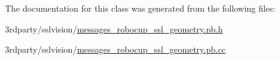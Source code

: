 The documentation for this class was generated from the following files\-:\begin{DoxyCompactItemize}
\item 
3rdparty/sslvision/\hyperlink{messages__robocup__ssl__geometry_8pb_8h}{messages\-\_\-robocup\-\_\-ssl\-\_\-geometry.\-pb.\-h}\item 
3rdparty/sslvision/\hyperlink{messages__robocup__ssl__geometry_8pb_8cc}{messages\-\_\-robocup\-\_\-ssl\-\_\-geometry.\-pb.\-cc}\end{DoxyCompactItemize}
